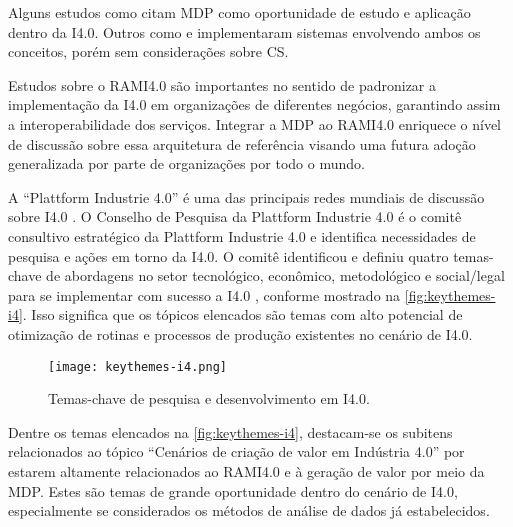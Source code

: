 Alguns estudos como  citam MDP como oportunidade de estudo e aplicação dentro da I4.0. Outros como  e  implementaram sistemas envolvendo ambos os conceitos, porém sem considerações sobre CS.


Estudos sobre o RAMI4.0 são importantes no sentido de padronizar a implementação da I4.0 em organizações de diferentes negócios, garantindo assim a interoperabilidade dos serviços. Integrar a MDP ao RAMI4.0 enriquece o nível de discussão sobre essa arquitetura de referência visando uma futura adoção generalizada por parte de organizações por todo o mundo.

A ``Plattform Industrie 4.0'' é uma das principais redes mundiais de discussão sobre I4.0 \cite{kagermann2013recommendations, acatech2014plattform, hartmut2019plattform}. O Conselho de Pesquisa da Plattform Industrie 4.0 é o comitê consultivo estratégico da Plattform Industrie 4.0 e identifica necessidades de pesquisa e ações em torno da I4.0. O comitê identificou e definiu quatro temas-chave de abordagens no setor tecnológico, econômico, metodológico e social/legal para se implementar com sucesso a I4.0 \cite{hirsch-kreinsen2019keythemes}, conforme mostrado na \autoref{fig:keythemes-i4}. Isso significa que os tópicos elencados são temas com alto potencial de otimização de rotinas e processos de produção existentes no cenário de I4.0.

\begin{figure}[htb]
	\centering
	\texttt{[image: keythemes-i4.png]}
	\caption{Temas-chave de pesquisa e desenvolvimento em I4.0.}
	\label{fig:keythemes-i4}
\end{figure}

Dentre os temas elencados na \autoref{fig:keythemes-i4}, destacam-se os subitens relacionados ao tópico ``Cenários de criação de valor em Indústria 4.0'' por estarem altamente relacionados ao RAMI4.0 e à geração de valor por meio da MDP. Estes são temas de grande oportunidade dentro do cenário de I4.0, especialmente se considerados os métodos de análise de dados já estabelecidos.

